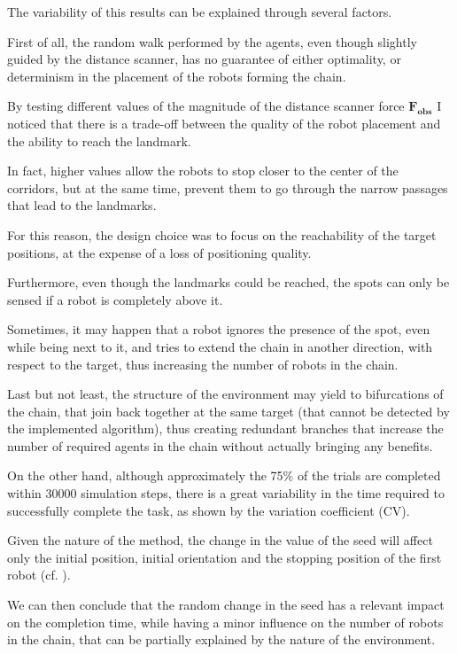 The variability of this results can be explained through several factors.

First of all, the random walk performed by the agents, even though slightly guided by the distance scanner, has no guarantee of either optimality, or determinism in the placement of the robots forming the chain.

By testing different values of the magnitude of the distance scanner force $\mathbf{F_{obs}}$ I noticed that there is a trade-off between the quality of the robot placement and the ability to reach the landmark.

In fact, higher values allow the robots to stop closer to the center of the corridors, but at the same time, prevent them to go through the narrow passages that lead to the landmarks.

For this reason, the design choice was to focus on the reachability of the target positions, at the expense of a loss of positioning quality.

Furthermore, even though the landmarks could be reached, the spots can only be sensed if a robot is completely above it.
 
Sometimes, it may happen that a robot ignores the presence of the spot, even while being next to it, and tries to extend the chain in another direction, with respect to the target, thus increasing the number of robots in the chain.

Last but not least, the structure of the environment may yield to bifurcations of the chain, that join back together at the same target (that cannot be detected by the implemented algorithm), thus creating redundant branches that increase the number of required agents in the chain without actually bringing any benefits.

On the other hand, although approximately the 75\% of the trials are completed within 30000 simulation steps, there is a great variability in the time required to successfully complete the task, as shown by the variation coefficient (CV).

Given the nature of the method, the change in the value of the seed will affect only the initial position, initial orientation and the stopping position of the first robot (cf. ).

We can then conclude that the random change in the seed has a relevant impact on the completion time, while having a minor influence on the number of robots in the chain, that can be partially explained by the nature of the environment.

